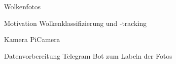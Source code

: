 \begin{frame}[t]{Wolkenfotos}
  \begin{block}{Motivation}
    Wolkenklassifizierung und -tracking
  \end{block}
  \begin{block}{Kamera}
    PiCamera
  \end{block}
  \begin{block}{Datenvorbereitung}
    Telegram Bot zum Labeln der Fotos
  \end{block}
\end{frame}

